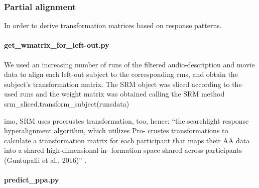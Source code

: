 {\subsubsection{Partial alignment}



In order to derive transformation matrices based on response patterns.

\paragraph{get\_wmatrix\_for\_left-out.py}

We used an increasing number of runs of the filtered audio-description and movie
data to align each left-out subject to the corresponding \ac{cms}, and obtain
the subject's transformation matrix.
%
The SRM object was sliced according to the used runs and the weight matrix was
obtained calling the SRM method srm\_sliced.transform\_subject(runsdata)

imo, SRM uses procrustes transformation, too, hence: ``the searchlight response
hyperalignment algorithm, which utilizes Pro- crustes transformations to
calculate a transformation matrix for each participant that maps their AA data
into a shared high-dimensional in- formation space shared across participants
(Guntupalli et al., 2016)'' \citep{busch2021hybrid}.

\paragraph{predict\_ppa.py}


}
